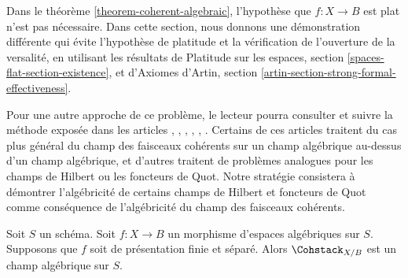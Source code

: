 \noindent
Dans le théorème \ref{theorem-coherent-algebraic}, l'hypothèse que
$f : X \to B$ est plat n'est pas nécessaire. Dans cette section, nous donnons
une démonstration différente qui évite l'hypothèse de platitude et la
vérification de l'ouverture de la versalité, en utilisant les résultats de
Platitude sur les espaces, section \ref{spaces-flat-section-existence}, et
d'Axiomes d'Artin, section
\ref{artin-section-strong-formal-effectiveness}.

\medskip\noindent
Pour une autre approche de ce problème, le lecteur pourra consulter
\cite{ArtinI} et suivre la méthode exposée dans les articles
\cite{olsson-starr}, \cite{lieblich_remarks}, \cite{olsson_proper},
\cite{Hall-Rydh}, \cite{Hall-Rydh-Hilbert}, \cite{rydh_representability}.
Certains de ces articles traitent du cas plus général du champ des faisceaux
cohérents sur un champ algébrique au-dessus d'un champ algébrique, et d'autres
traitent de problèmes analogues pour les champs de Hilbert ou les foncteurs de
Quot. Notre stratégie consistera à démontrer l'algébricité de certains champs
de Hilbert et foncteurs de Quot comme conséquence de l'algébricité du champ des
faisceaux cohérents.

\begin{theorem}
\label{theorem-coherent-algebraic-general}
Soit $S$ un schéma. Soit $f : X \to B$ un morphisme d'espaces algébriques sur
$S$. Supposons que $f$ soit de présentation finie et séparé. Alors
$\Cohstack_{X/B}$ est un champ algébrique sur $S$.
\end{theorem}

